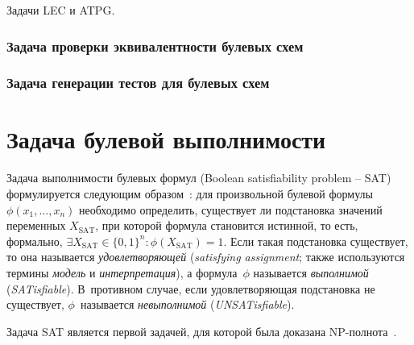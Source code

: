Задачи LEC и ATPG.

\subsubsection{Задача проверки эквивалентности булевых схем}
\label{subsub:lec}

\subsubsection{Задача генерации тестов для булевых схем}
\label{subsub:atpg}


\section{Задача булевой выполнимости}
\label{sec:sat}

Задача выполнимости булевых формул (Boolean satisfiability problem \--- SAT) формулируется следующим образом~\cite{handbook-sat}: для произвольной булевой формулы~$\phi(x_1, \dotsc, x_n)$ необходимо определить, существует ли подстановка значений переменных $X_\text{SAT}$, при которой формула становится истинной, то есть, формально, $\exists X_\text{SAT} \in \{0,1\}^n : \phi(X_\text{SAT}) = 1$.
Если такая подстановка существует, то она называется \textit{удовлетворяющей} (\textit{satisfying assignment}; также используются термины \textit{модель} и \textit{интерпретация}), а формула~$\phi$ называется \textit{выполнимой} (\textit{SATisfiable}).
В~противном случае, если удовлетворяющая подстановка не существует, $\phi$~называется \textit{невыполнимой} (\textit{UNSATisfiable}).

Задача SAT является первой задачей, для которой была доказана NP-полнота~\cite{cook}.




